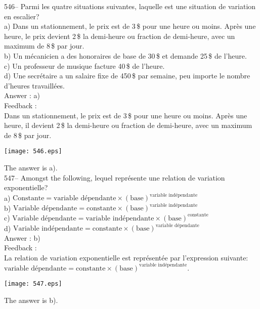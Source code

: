 ﻿\documentclass[letterpaper, 12pt]{article}
\begin{document}
546-- Parmi les quatre situations suivantes, laquelle est une situation de
variation en escalier?\\
a) Dans un stationnement, le prix est de 3\,\$ pour une heure ou moins.
Apr\`es une heure, le prix devient 2\,\$ la demi-heure ou fraction de
demi-heure, avec un maximum de 8\,\$ par jour.  \\
b) Un m\'ecanicien a des honoraires de base de 30\,\$ et demande 25\,\$ de
l'heure.\\
c) Un professeur de musique facture 40\,\$ de l'heure.\\
d) Une secr\'etaire a un salaire fixe de 450\,\$ par semaine, peu importe le
nombre d'heures travaill\'ees.\\

Answer : a) \\

Feedback : \\
Dans un stationnement, le prix est de 3\,\$ pour une heure ou moins.
Apr\`es une heure, il devient 2\,\$ la demi-heure ou fraction de demi-heure,
avec un maximum de 8\,\$ par jour.
   \begin{center}
    \texttt{[image: 546.eps]}
    \end{center}
The answer is a).\\

547-- Amongst the following, lequel repr\'esente une relation de
variation exponentielle?\\[2mm]
a) $\textrm{Constante}=\textrm{variable
d\'ependante}\times\left(\textrm{base}\right) ^{\textrm{variable
ind\'ependante}}$\\[2mm]
b) $\textrm{Variable
d\'ependante}=\textrm{constante}\times\left(\textrm{base}\right)
^{\textrm{variable ind\'ependante}}$\\[2mm]
c) $\textrm{Variable
d\'ependante}=\textrm{variable
ind\'ependante}\times\left(\textrm{base}\right)
^{\textrm{constante}}$\\ [2mm]
d) $\textrm{Variable
ind\'ependante}=\textrm{constante}\times\left(\textrm{base}\right)
^{\textrm{variable d\'ependante}}$\\

Answer : b)\\

Feedback : \\
La relation de variation exponentielle est repr\'esent\'ee par l'expression
suivante:\\[2mm]
$\textrm{variable
d\'ependante}=\textrm{constante}\times\left(\textrm{base}\right)
^{\textrm{variable ind\'ependante}}.$\\[2mm]
   \begin{center}
    \texttt{[image: 547.eps]}
    \end{center}
The answer is b).\\
\end{document}
